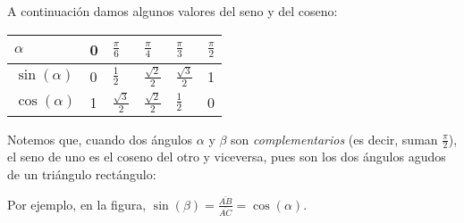 \documentclass[../Teoría.root.tex]{subfiles}
\begin{document}
A continuación damos algunos valores del seno y del coseno:
\begin{center}
    \begin{tabularx}{\textwidth}{|X|X|X|X|X|X|}
        \hline
        \(\alpha\)       & 0 & \(\frac{\pi}{6}\)      & \(\frac{\pi}{4}\)      & \(\frac{\pi}{3}\)      & \(\frac{\pi}{2}\) \\\hline
        \(\sin(\alpha)\) & 0 & \(\frac{1}{2}\)        & \(\frac{\sqrt{2}}{2}\) & \(\frac{\sqrt{3}}{2}\) & 1                 \\\hline
        \(\cos(\alpha)\) & 1 & \(\frac{\sqrt{3}}{2}\) & \(\frac{\sqrt{2}}{2}\) & \(\frac{1}{2}\)        & 0                 \\\hline
    \end{tabularx}
\end{center}
Notemos que, cuando dos ángulos \(\alpha\) y \(\beta\) son \textit{complementarios} (es decir, suman \(\frac{\pi}{2}\)), el seno de uno es el coseno del otro y viceversa, pues son los dos ángulos agudos de un triángulo rectángulo:
\begin{center}
\end{center}
Por ejemplo, en la figura, \(\sin(\beta)=\frac{\overline{AB}}{\overline{AC}}=\cos(\alpha)\).
\end{document}
